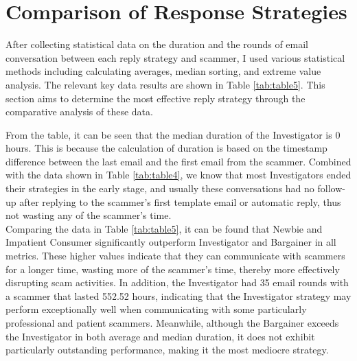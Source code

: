 \documentclass[ oneside,%
                    author={Cassie Qing Tang},
                    degree={BSc},
                     title={An Automated Response System for Disrupting Online Pet Scamming \\ },
                    subtitle={ }]{dissertation}
\begin{document}
\section{Comparison of Response Strategies}
After collecting statistical data on the duration and the rounds of email conversation between each reply strategy and scammer, I used various statistical methods including calculating averages, median sorting, and extreme value analysis. The relevant key data results are shown in Table \ref{tab:table5}. This section aims to determine the most effective reply strategy through the comparative analysis of these data.
{\small
\begin{table}[ht]
\centering
\renewcommand{\arraystretch}{1.6}
\caption{Comparison of response strategies across various metrics}
\label{tab:table5}
\end{table}
} 

From the table, it can be seen that the median duration of the Investigator is 0 hours. This is because the calculation of duration is based on the timestamp difference between the last email and the first email from the scammer. Combined with the data shown in Table \ref{tab:table4}, we know that most Investigators ended their strategies in the early stage, and usually these conversations had no follow-up after replying to the scammer's first template email or automatic reply, thus not wasting any of the scammer's time.
\\

Comparing the data in Table \ref{tab:table5}, it can be found that Newbie and Impatient Consumer significantly outperform Investigator and Bargainer in all metrics. These higher values indicate that they can communicate with scammers for a longer time, wasting more of the scammer's time, thereby more effectively disrupting scam activities. In addition, the Investigator had 35 email rounds with a scammer that lasted 552.52 hours, indicating that the Investigator strategy may perform exceptionally well when communicating with some particularly professional and patient scammers. Meanwhile, although the Bargainer exceeds the Investigator in both average and median duration, it does not exhibit particularly outstanding performance, making it the most mediocre strategy.
\\
\end{document}
